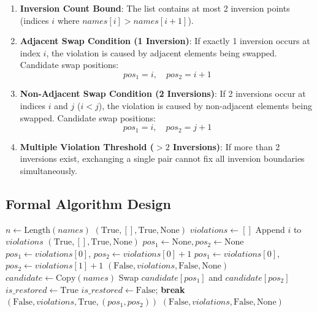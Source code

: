 \begin{enumerate}
    \item \textbf{Inversion Count Bound}: The list contains at most 2 inversion points (indices $i$ where $names[i] > names[i+1]$).
    \item \textbf{Adjacent Swap Condition (1 Inversion)}:
    If exactly 1 inversion occurs at index $i$, the violation is caused by adjacent elements being swapped. Candidate swap positions:
    \[
    pos_1 = i, \quad pos_2 = i + 1
    \]
    \item \textbf{Non-Adjacent Swap Condition (2 Inversions)}:
    If 2 inversions occur at indices $i$ and $j$ ($i < j$), the violation is caused by non-adjacent elements being swapped. Candidate swap positions:
    \[
    pos_1 = i, \quad pos_2 = j + 1
    \]
    \item \textbf{Multiple Violation Threshold ($> 2$ Inversions)}:
    If more than 2 inversions exist, exchanging a single pair cannot fix all inversion boundaries simultaneously.
\end{enumerate}

\subsection{Formal Algorithm Design}

\begin{algorithm}[H]
\caption{Nearly Ordered Directory Analysis and Single Swap Restoration}
\begin{algorithmic}[1]
    \State $n \gets \text{Length}(names)$
     \Return $(\text{True}, [], \text{True}, \text{None})$ \EndIf
    \State $violations \gets []$ 
            \State Append $i$ to $violations$
        \EndIf
    \EndFor
        \State \Return $(\text{True}, [], \text{True}, \text{None})$
    \EndIf
    \State $pos_1 \gets \text{None}, pos_2 \gets \text{None}$ 
        \State $pos_1 \gets violations[0]$, $pos_2 \gets violations[0] + 1$
        \State $pos_1 \gets violations[0]$, $pos_2 \gets violations[1] + 1$
    \Else
        \State \Return $(\text{False}, violations, \text{False}, \text{None})$ 
    \EndIf
    \State $candidate \gets \text{Copy}(names)$ 
    \State Swap $candidate[pos_1]$ and $candidate[pos_2]$
    \State $is\_restored \gets \text{True}$
            \State $is\_restored \gets \text{False}$; \textbf{break}
        \EndIf
    \EndFor
        \State \Return $(\text{False}, violations, \text{True}, (pos_1, pos_2))$
    \Else
        \State \Return $(\text{False}, violations, \text{False}, \text{None})$
    \EndIf
\EndFunction
\end{algorithmic}
\end{algorithm}

